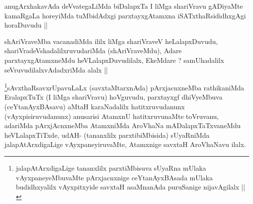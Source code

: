 \begin{artha}
anugArxhakavAda deVvategaLiMda biDalapxTa I liMga shariVravu gADiyaMte
kamaRgaLa horeyiMda tuMbidAdxgi parxtayxgAtamxna iSATxthaRsididhxgAgi
horaDuvudu ||
\end{artha}


\begin{artha}
shAriVraveMba vacanadiMda ililx liMga shariVraveV heLalapxDuvudu,
shariVradeVshadalilxruvudariMda (shAriVraveMdu), Adare
parxtayxgAtamxneMdu heVLalapxDuvudilalx, EkeMdare ? samUhadalilx
seVruvudilalxvAdadxriMda alalx ||
\end{artha}


\begin{artha}
\footnote[1]{jalapAtArxdigaLige tananxlilx parxtiMbisuva sUyaRna
  mUlaka vAyxpaneyeMbuvaMte pArxjacnxnige ceYtanAyxBAsada mUlaka
  budidhxyalilx vAyxpitxyide savxtaH asaMnanAda puruSanige
  nijavAgilalx ||}sAvxthaRsavxrUpavuLaLx (savxtaMtarxnAda) pArxjacnxneMba
rathikaniMda EralapxTuTx (I liMga shariVravu) hoVguvudu, parxtayxgf
dhiVyeMbuva (ceYtanAyxBAsavu) aMtaH karaNadalilx hatitxruvudanunx
(vAyxpisiruvudanunx) anusarisi AtamxnU hatitxruvunaMte toVruvanu,
adariMda pArxjAcnxneMba AtamxniMda AroVhaNa mADalapxTaTxvaneMdu
heVLalapxTiTxde, udAH- (tananxlilx parxtibiMbisida) sUyaRniMda
jalapAtArxdigaLige vAyxpaneyiruvaMte, Atamxnige savxtaH AroVhaNavu ilalx. 
\end{artha}


\begin{artha}

\end{artha}

\begin{artha}

\end{artha}

\begin{artha}

\end{artha}

\begin{artha}

\end{artha}

\begin{artha}

\end{artha}

